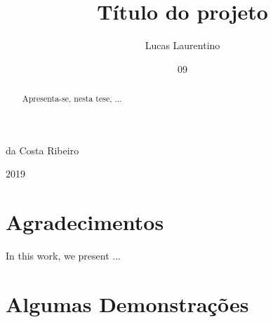 \documentclass[grad,numbers]{coppe}
\begin{document}
	\title{Título do projeto}
    \author{Lucas Laurentino}{da Costa Ribeiro}
    
    
    
    \date{09}{2019}
    
    
    \maketitle
    
    \frontmatter

\dedication{
}

\chapter*{Agradecimentos}


\begin{abstract}

  Apresenta-se, nesta tese, ...

\end{abstract}

\begin{foreignabstract}

In this work, we present ...

\end{foreignabstract}

\tableofcontents
\listoffigures
\listoftables
\printlosymbols
\printloabbreviations


\mainmatter

 


  


  
  


\backmatter



\appendix
\chapter{Algumas Demonstrações}
  	
\end{document}
